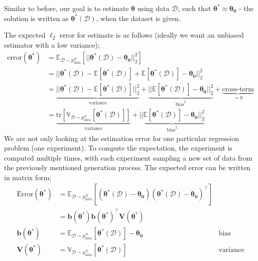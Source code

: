 \documentclass[a4paper, 12pt]{article}
\newcommand{\mat}[1]{\boldsymbol{#1}}
\begin{document}
                Similar to before, our goal is to estimate $\mat{\theta}$ using data $\mathcal{D}$, such that $\mat{\theta^*} \approx \mat{\theta_0}$ - the solution is written as $\mat{\theta^*}(\mathcal{D})$, when the dataset is given.
                \medskip

                The expected $\ell_2$ error for estimate is as follows (ideally we want an unbiased estimator with a low variance);
                \begin{align*}
                    \mathrm{error}(\mat{\theta^*}) & = \mathbb{E}_{\mathcal{D} \sim p_\text{data}^N}[|| \mat{\theta^*}(\mathcal{D}) - \mat{\theta_0} ||_2^2] \\
                    & = || \mat{\theta^*}(\mathcal{D}) - \mathbb{E}[\mat{\theta^*}(\mathcal{D})] + \mathbb{E}[\mat{\theta^*}(\mathcal{D})] - \mat{\theta_0} ||_2^2 \\
                    & = \underbrace{|| \mat{\theta^*}(\mathcal{D}) - \mathbb{E}[\mat{\theta^*}(\mathcal{D})] ||_2^2}_\text{variance} + \underbrace{|| \mathbb{E}[\mat{\theta^*}(\mathcal{D})] - \mat{\theta_0} ||_2^2}_{\text{bias}^2} + \underbrace{\text{cross-term}}_{= 0} \\
                    & = \underbrace{\mathrm{tr}[\mathbb{V}_{\mathcal{D} \sim p_\text{data}^N}[\mat{\theta^*}(\mathcal{D})]]}_\text{variance} + \underbrace{|| \mathbb{E}[\mat{\theta^*}(\mathcal{D})] - \mat{\theta_0} ||_2^2}_{\text{bias}^2}
                \end{align*}
                We are not only looking at the estimation error for one particular regression problem (one experiment).
                To compute the expectation, the experiment is computed multiple times, with each experiment sampling a new set of data from the previously mentioned generation process.
                The expected error can be written in matrix form;
                \begin{align*}
                    \mathrm{Error}(\mat{\theta^*}) & = \mathbb{E}_{\mathcal{D} \sim p_\text{data}^N}[(\mat{\theta^*}(\mathcal{D}) - \mat{\theta_0})(\mat{\theta^*}(\mathcal{D}) - \mat{\theta_0})^\top] \\
                    & = \mat{b}(\mat{\theta^*})\mat{b}(\mat{\theta^*})^\top \mat{V}(\mat{\theta^*}) \\
                    \mat{b}(\mat{\theta^*}) & = \mathbb{E}_{\mathcal{D} \sim p_\text{data}^N}[\mat{\theta^*}(\mathcal{D})] - \mat{\theta_0} & \text{bias} \\
                    \mat{V}(\mat{\theta^*}) & = \mathbb{V}_{\mathcal{D} \sim p_\text{data}^N}[\mat{\theta^*}(\mathcal{D})] & \text{variance}
                \end{align*}
\end{document}
